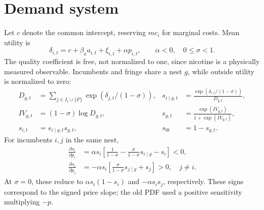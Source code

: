 \documentclass[11pt]{article}
\begin{document}
\section{Demand system}
Let $c$ denote the common intercept, reserving $mc_i$ for marginal costs. Mean utility is
\begin{equation}\label{eq:utility}
\delta_{i,t}=c+\beta_a a_{i,t}+\xi_{i,t}+\alpha p_{i,t},\qquad \alpha<0,\quad 0\leq\sigma<1.
\end{equation}
The quality coefficient is free, not normalized to one, since nicotine is a physically measured observable. Incumbents and fringe share a nest $g$, while outside utility is normalized to zero:
\begin{align}
D_{g,t}&=\sum_{j\in I_t\cup\{F\}}\exp(\delta_{j,t}/(1-\sigma)),&
s_{i\mid g,t}&=\frac{\exp(\delta_{i,t}/(1-\sigma))}{D_{g,t}},\label{eq:conditional}\\
IV_{g,t}&=(1-\sigma)\log D_{g,t},&s_{g,t}&=\frac{\exp(IV_{g,t})}{1+\exp(IV_{g,t})},\\
s_{i,t}&=s_{i\mid g,t}s_{g,t},&s_{0t}&=1-s_{g,t}.\label{eq:shares}
\end{align}
For incumbents $i,j$ in the same nest,
\begin{align}
\frac{\partial s_i}{\partial p_i}
&=\alpha s_i\left[\frac{1}{1-\sigma}-\frac{\sigma}{1-\sigma}s_{i\mid g}-s_i\right]<0,\label{eq:own}\\
\frac{\partial s_i}{\partial p_j}
&=-\alpha s_i\left[\frac{\sigma}{1-\sigma}s_{j\mid g}+s_j\right]>0,\quad j\ne i.\label{eq:cross}
\end{align}
At $\sigma=0$, these reduce to $\alpha s_i(1-s_i)$ and $-\alpha s_is_j$, respectively. These signs correspond to the signed price slope; the old PDF used a positive sensitivity multiplying $-p$.
\end{document}
